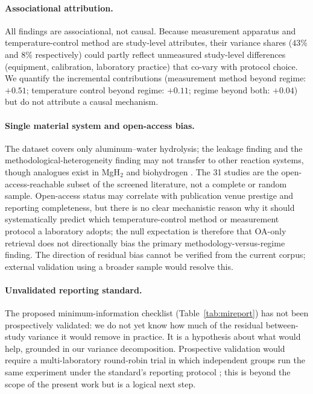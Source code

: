 \paragraph{Associational attribution.}
All findings are associational, not causal. Because measurement apparatus and temperature-control
method are study-level attributes, their variance shares ($43\%$ and $8\%$ respectively)
could partly reflect unmeasured study-level differences (equipment, calibration, laboratory
practice) that co-vary with protocol choice. We quantify the incremental contributions
(measurement method beyond regime: $+0.51$; temperature control beyond regime: $+0.11$;
regime beyond both: $+0.04$) but do not attribute a causal mechanism.

\paragraph{Single material system and open-access bias.}
The dataset covers only aluminum--water hydrolysis; the leakage finding and the
methodological-heterogeneity finding may not transfer to other reaction systems, though
analogues exist in MgH$_2$ and biohydrogen \citep{wulf2021,hoque2018}. The 31 studies
are the open-access-reachable subset of the screened literature, not a complete or
random sample. Open-access status may correlate with publication venue prestige and
reporting completeness, but there is no clear mechanistic reason why it should
systematically predict which temperature-control method or measurement protocol a
laboratory adopts; the null expectation is therefore that OA-only retrieval does not
directionally bias the primary methodology-versus-regime finding. The direction of
residual bias cannot be verified from the current corpus; external validation using a
broader sample would resolve this.

\paragraph{Unvalidated reporting standard.}
The proposed minimum-information checklist (Table~\ref{tab:mireport}) has not been
prospectively validated: we do not yet know how much of the residual between-study
variance it would remove in practice. It is a hypothesis about what would help, grounded
in our variance decomposition. Prospective validation would require a multi-laboratory
round-robin trial in which independent groups run the same experiment under the
standard's reporting protocol \citep[analogous to those for MgH$_2$ and
biohydrogen;][]{wulf2021,hoque2018}; this is beyond the scope of the present work
but is a logical next step.

